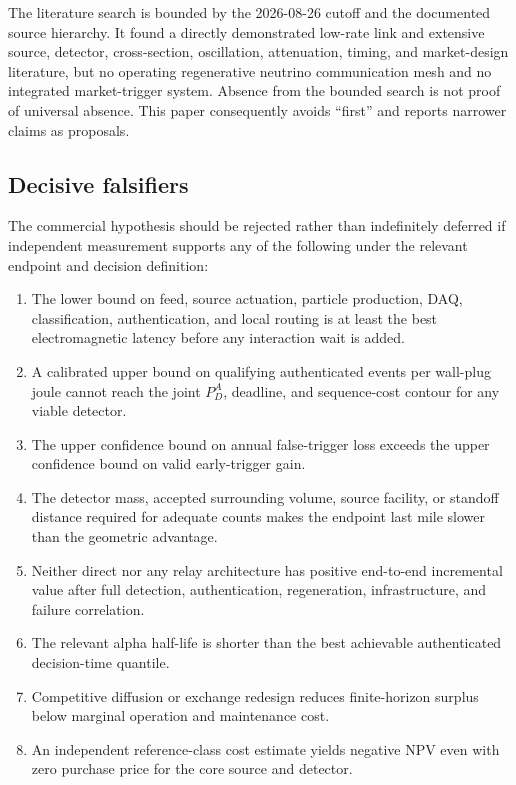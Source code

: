 \documentclass[11pt]{article}
\begin{document}
The literature search is bounded by the 2026-08-26 cutoff and the documented source hierarchy. It found a directly demonstrated low-rate link and extensive source, detector, cross-section, oscillation, attenuation, timing, and market-design literature, but no operating regenerative neutrino communication mesh and no integrated market-trigger system. Absence from the bounded search is not proof of universal absence. This paper consequently avoids ``first'' and reports narrower claims as proposals.

\subsection{Decisive falsifiers}

The commercial hypothesis should be rejected rather than indefinitely deferred if independent measurement supports any of the following under the relevant endpoint and decision definition:

\begin{enumerate}[leftmargin=*]
  \item The lower bound on feed, source actuation, particle production, DAQ, classification, authentication, and local routing is at least the best electromagnetic latency before any interaction wait is added.
  \item A calibrated upper bound on qualifying authenticated events per wall-plug joule cannot reach the joint $P_D^{A}$, deadline, and sequence-cost contour for any viable detector.
  \item The upper confidence bound on annual false-trigger loss exceeds the upper confidence bound on valid early-trigger gain.
  \item The detector mass, accepted surrounding volume, source facility, or standoff distance required for adequate counts makes the endpoint last mile slower than the geometric advantage.
  \item Neither direct nor any relay architecture has positive end-to-end incremental value after full detection, authentication, regeneration, infrastructure, and failure correlation.
  \item The relevant alpha half-life is shorter than the best achievable authenticated decision-time quantile.
  \item Competitive diffusion or exchange redesign reduces finite-horizon surplus below marginal operation and maintenance cost.
  \item An independent reference-class cost estimate yields negative NPV even with zero purchase price for the core source and detector.
\end{enumerate}
\end{document}

